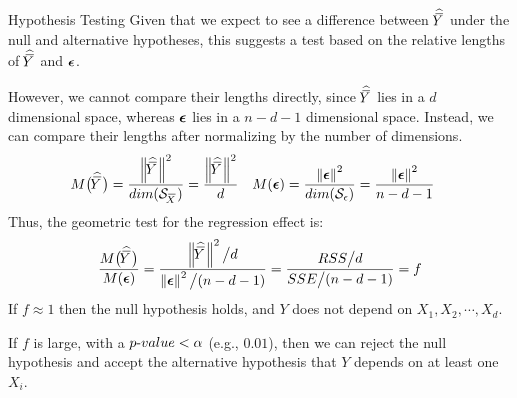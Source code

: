 \begin{frame}{Hypothesis Testing}
Given that we expect to see a difference between $\hmY$ under the null
and alternative hypotheses, this suggests a test based on the relative lengths of $\hmY$ and
$\bepsilon$.%

\medskip

However, %
we cannot compare their lengths directly, since $\hmY$
lies in a $d$ dimensional space, whereas $\bepsilon$ lies in a $n-d-1$
dimensional space. Instead, we can compare their lengths after
normalizing by
the number of dimensions. %
\begin{align*}
    M\bigl(\hmY\bigr) & = \frac{\norm{\hmY}^2}{dim(\cS_{\mX})} = 
	\frac{\norm{\hmY}^2}{d} &
    M(\bepsilon) & = \frac{\norm{\bepsilon}^2}{dim(\cS_\epsilon)} = 
   \frac{\norm{\bepsilon}^2}{n-d-1}
\end{align*}
Thus, the geometric test for the regression effect is: %
\begin{align*}
    \frac{M\bigl(\hmY\bigr)}{M(\bepsilon)} = 
    \frac{\norm{\hmY}^2\big/ d}{\norm{\bepsilon}^2 \big/ (n-d-1)}
    = \frac{RSS\big/d}{SSE\big/(n-d-1)} = f
\end{align*}
If $f \approx 1$ then the
null hypothesis holds, and %
$Y$ does not depend on %
$X_1, X_2, \cdots, X_d$. 

\medskip

If $f$
is large, with a $\pvalue < \alpha$ (e.g.,
$0.01$), then we can reject
the null hypothesis and accept the alternative hypothesis that $Y$
depends on at least one $X_i$.
\end{frame}
%
